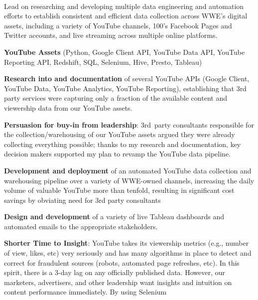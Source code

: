  \\
  Lead on researching and developing multiple data engineering and
  automation efforts to establish consistent and efficient data collection
  across WWE's digital assets, including a variety of YouTube channels,
  100's Facebook Pages and Twitter accounts, and live streaming across
  multiple online platforms.
\begin{itemize*}
  \item\leftandright
    {\textbf{YouTube Assets}}
    {\small{(Python, Google Client API, YouTube Data API, YouTube
    Reporting API, Redshift, SQL, Selenium, Hive, Presto, Tableau)}}
    \begin{itemize*}
      \item \textbf{Research into and documentation} of several YouTube APIs
        (Google Client, YouTube Data, YouTube Analytics, YouTube
        Reporting), establishing that 3rd party services were capturing 
        only a fraction of the available content and viewership data from 
        our YouTube assets.  
      \item \textbf{Persuasion for buy-in from leadership}:  3rd party
        consultants responsible for the collection/warehousing of
        our YouTube assets argued they were already 
        collecting everything possible; thanks to my
        research and documentation, key decision makers supported my 
        plan to revamp the YouTube data pipeline.
      \item \textbf{Development and deployment} of an        
        automated YouTube data collection and warehousing pipeline 
        over a variety of WWE-owned channels, increasing the daily volume of
        valuable YouTube  more than tenfold, resulting in significant 
        cost savings by obviating need for 3rd party consultants
      \item \textbf{Design and development} of a variety of
        live Tableau dashboards and automated emails to the appropriate
        stakeholders.
      \item \textbf{Shorter Time to Insight}: YouTube takes its viewership metrics
        (e.g., number of view, likes, etc) very seriously and has many
        algorithms in place to detect and correct for fraudulent sources
        (robots, automated page refreshes, etc).  In this spirit, there
        is a 3-day lag on any officially published data.  However, our
        marketers, advertisers, and other leadership want insights and
        intuition on content performance immediately.  By using Selenium

\end{itemize*}
\end{itemize*}
